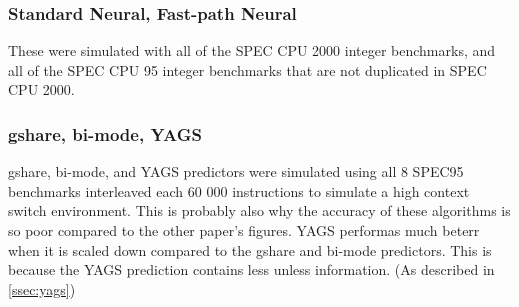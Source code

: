 \subsubsection*{Standard Neural, Fast-path Neural}
These were simulated with all of the SPEC CPU 2000 integer benchmarks, and all of the SPEC CPU 95 integer benchmarks that are not duplicated in SPEC CPU 2000.

\subsubsection*{gshare, bi-mode, YAGS}
gshare, bi-mode, and YAGS predictors were simulated using all 8 SPEC95 benchmarks interleaved each 60 000 instructions to simulate a high context switch environment. This is probably also why the accuracy of these algorithms is so poor compared to the other paper's figures.
YAGS performas much beterr when it is scaled down compared to the gshare and bi-mode predictors.
This is because the YAGS prediction contains less unless information. (As described in \ref{ssec:yags})